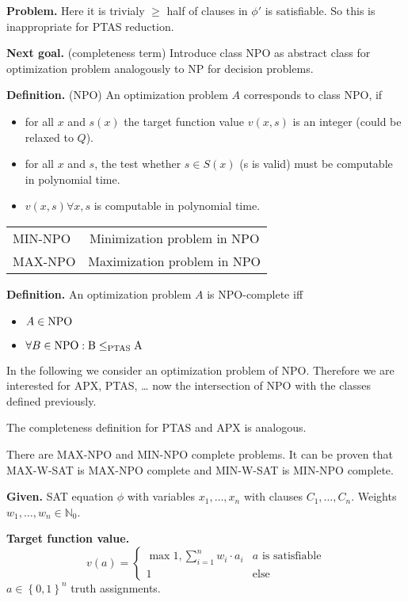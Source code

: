 \documentclass[a4paper]{article}
\newcommand{\cls}[1]{\rm{#1}}
\newcommand{\set}[1]{\left\{#1\right\}}
\begin{document}
\textbf{Problem.}
  Here it is trivialy $\geq$ half of clauses in $\phi'$ is satisfiable.
  So this is inappropriate for PTAS reduction.

\textbf{Next goal.} (completeness term)
  Introduce class \cls{NPO} as abstract class for optimization problem
  analogously to \cls{NP} for decision problems.

\textbf{Definition.} (\cls{NP}O)
  An optimization problem $A$ corresponds to class \cls{NP}O, if
\begin{itemize}
  \item
    for all $x$ and $s(x)$ the target function value $v(x, s)$
    is an integer (could be relaxed to $Q$).
  \item
    for all $x$ and $s$, the test whether $s \in S(x)$ (s is valid)
    must be computable in polynomial time.
  \item $v(x, s) \forall x, s$ is computable in polynomial time.
\end{itemize}

\begin{center}
  \begin{tabular}{lc}
    MIN-NPO & Minimization problem in \cls{NP}O \\
    MAX-NPO & Maximization problem in \cls{NP}O
  \end{tabular}
\end{center}

\textbf{Definition.}
  An optimization problem $A$ is \cls{NP}O-complete iff
\begin{itemize}
  \item $A \in \cls{NPO}$
  \item $\forall B \in \cls{NPO}: B \leq_{\cls{PTAS}} A$
\end{itemize}

In the following we consider an optimization problem of \cls{NP}O.
Therefore we are interested for APX, PTAS, \dots{} now the intersection
of \cls{NP}O with the classes defined previously.

The completeness definition for PTAS and APX is analogous.

There are MAX-NPO and MIN-NPO complete problems. It can be proven
that MAX-W-SAT is MAX-NPO complete and MIN-W-SAT is MIN-NPO complete.

\textbf{Given.} SAT equation $\phi$ with variables $x_1, \ldots, x_n$
  with clauses $C_1, \ldots, C_n$. Weights $w_1, \ldots, w_n \in \mathbb{N}_0$.

\textbf{Target function value.}
  \[
    v(a) = \begin{cases}
      \max{1, \sum_{i=1}^n w_i \cdot a_i}  & a \text{ is satisfiable} \\
      1 & \text{else}
    \end{cases}
  \]
  $a \in \set{0,1}^n$ truth assignments.
\end{document}
